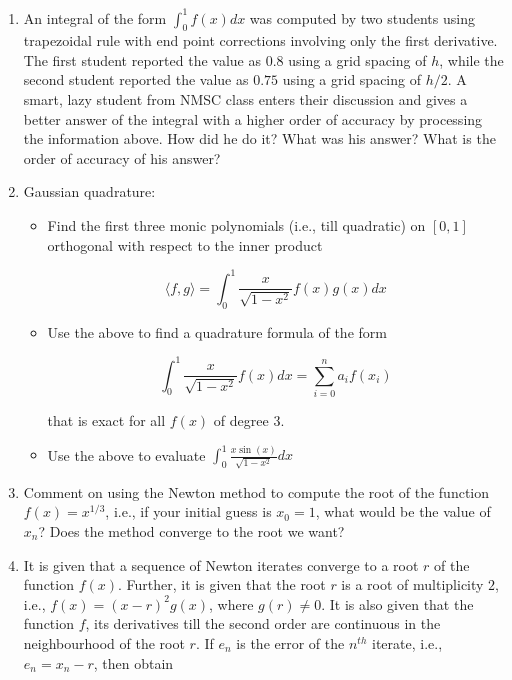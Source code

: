 \documentclass[a4paper,11pt]{report}
\begin{document}
\doublespacing
\begin{enumerate}

    \item An integral of the form $\displaystyle \int_{0}^{1} f(x) dx$ was computed
    by two students using trapezoidal rule with end point corrections involving only
    the first derivative. The first student reported the value as $0.8$ using a grid
    spacing of $h$, while the second student reported the value as $0.75$ using a grid
    spacing of $h/2$. A smart, lazy student from NMSC class enters their discussion
    and gives a better answer of the integral with a higher order of accuracy by processing
    the information above. How did he do it? What was his answer? What is the order of
    accuracy of his answer?

    \item Gaussian quadrature:
    \begin{itemize}
        \item Find the first three monic polynomials (i.e., till quadratic) on $[0, 1]$
        orthogonal with respect to the inner product

            \begin{equation*}
            \langle f, g \rangle = \int_{0}^{1} \frac{x}{\sqrt{1 - x^{2}}} f(x) g(x) dx
            \end{equation*}

        \item Use the above to find a quadrature formula of the form

            \begin{equation*}
            \int_{0}^{1} \frac{x}{\sqrt{1 - x^{2}}} f(x) dx = \sum_{i=0}^{n} a_{i} f(x_{i})
            \end{equation*}

        that is exact for all $f(x)$ of degree $3$.

        \item Use the above to evaluate $\displaystyle \int_{0}^{1} \frac{x \sin(x)}
        {\sqrt{1 - x^{2}}} dx$
    \end{itemize}

    \item Comment on using the Newton method to compute the root of the function $f(x)
    = x^{1/3}$, i.e., if your initial guess is $x_{0} = 1$, what would be the value of
    $x_{n}$? Does the method converge to the root we want?

    \item It is given that a sequence of Newton iterates converge to a root $r$ of the
    function $f(x)$. Further, it is given that the root $r$ is a root of multiplicity
    $2$, i.e., $f(x) = (x - r)^{2} g(x)$, where $g(r) \ne 0$. It is also given that the
    function $f$, its derivatives till the second order are continuous in the
    neighbourhood of the root $r$. If $e_{n}$ is the error of the $n^{th}$ iterate,
    i.e., $e_{n} = x_{n} - r$, then obtain


\end{enumerate}
\end{document}
